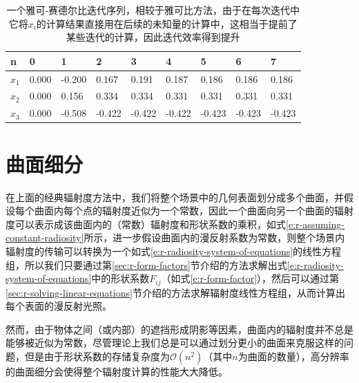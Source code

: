 \begin{table}
\caption{一个雅可-赛德尔比迭代序列，相较于雅可比方法，由于在每次迭代中它将$x_i$的计算结果直接用在后续的未知量的计算中，这相当于提前了某些迭代的计算，因此迭代效率得到提升}
\label{t:r-jacobi-seidel-iteration}
\begin{tabular}{p{}|p{}|p{}|p{}|p{}|p{}|p{}|p{}|p{}}
\hline 
   n & 0 & 1 & 2 & 3& 4& 5 &6 & 7 \\
    \hline  
  $x_1$ & 0.000 & -0.200 & 0.167  & 0.191  & 0.187  & 0.186  & 0.186  & 0.186\\
  $x_2$ & 0.000 & 0.156  & 0.334  & 0.334  & 0.331  & 0.331  & 0.331  & 0.331\\
  $x_3$ & 0.000 & -0.508 & -0.422 & -0.422 & -0.422 & -0.423 & -0.423 & -0.423\\
 \hline 
\end{tabular}
\end{table}








\section{曲面细分}\label{sec:r-meshing}
在上面的经典辐射度方法中，我们将整个场景中的几何表面划分成多个曲面，并假设每个曲面内每个点的辐射度近似为一个常数，因此一个曲面向另一个曲面的辐射度可以表示成该曲面内的（常数）辐射度和形状系数的乘积，如式\ref{e:r-assuming-constant-radiosity}所示，进一步假设曲面内的漫反射系数为常数，则整个场景内辐射度的传输可以转换为一个如式\ref{e:r-radiosity-system-of-equations}的线性方程组，所以我们只要通过第\ref{sec:r-form-factors}节介绍的方法求解出式\ref{e:r-radiosity-system-of-equations}中的形状系数$F_{ij}$（如式\ref{e:r-form-factor}），然后可以通过第\ref{sec:r-solving-linear-equations}节介绍的方法求解辐射度线性方程组，从而计算出每个表面的漫反射光照。

然而，由于物体之间（或内部）的遮挡形成阴影等因素，曲面内的辐射度并不总是能够被近似为常数，尽管理论上我们总是可以通过划分更小的曲面来克服这样的问题，但是由于形状系数的存储复杂度为$\mathcal{O}(n^{2})$（其中$n$为曲面的数量），高分辨率的曲面细分会使得整个辐射度计算的性能大大降低。

